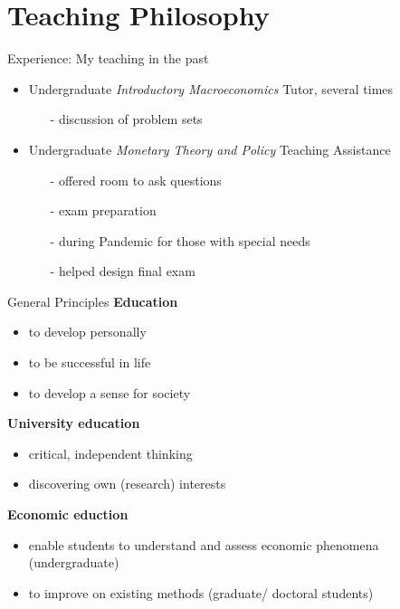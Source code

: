 

\section{Teaching Philosophy}


\begin{frame}{Experience: My teaching in the past}
	\begin{itemize}
		\item Undergraduate \textit{Introductory  Macroeconomics} Tutor, several times
		\vspace{2mm}
		\begin{itemize}
			\item[-] discussion of problem sets
		\end{itemize}
	\vspace{3mm}
		\item Undergraduate \textit{Monetary Theory and Policy} Teaching Assistance
		\vspace{2mm}		
		\begin{itemize}
			\item[-] offered room to ask questions
			\item[-] exam preparation 
			\item[-] during Pandemic for those with special needs
			\item[-] helped design final exam
		\end{itemize}
	\end{itemize}
\end{frame}

\begin{frame}{General Principles}
	\centering
\textbf{Education}
	\begin{itemize}
		\item  to develop personally 
		\item  to be successful in life %
		\item to develop a sense for society
	\end{itemize}
\textbf{University education}
\begin{itemize}	
	\item critical, independent thinking
	\item discovering own (research) interests %
\end{itemize}
\textbf{Economic eduction}
\begin{itemize}
	\item enable students to understand and assess economic phenomena (undergraduate)
	\item to improve on existing methods (graduate/ doctoral students)
\end{itemize}
\end{frame}

